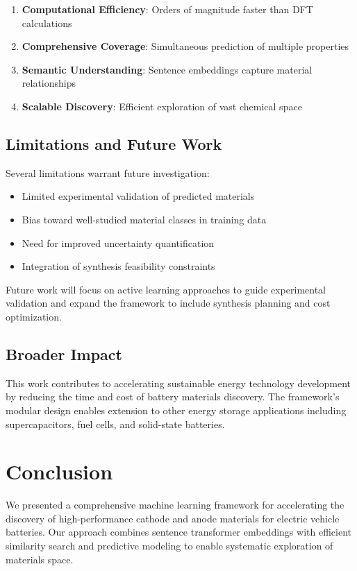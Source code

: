 \documentclass{article}
\begin{document}
\begin{enumerate}
\item \textbf{Computational Efficiency}: Orders of magnitude faster than DFT calculations
\item \textbf{Comprehensive Coverage}: Simultaneous prediction of multiple properties
\item \textbf{Semantic Understanding}: Sentence embeddings capture material relationships
\item \textbf{Scalable Discovery}: Efficient exploration of vast chemical space
\end{enumerate}

\subsection{Limitations and Future Work}

Several limitations warrant future investigation:
\begin{itemize}
\item Limited experimental validation of predicted materials
\item Bias toward well-studied material classes in training data
\item Need for improved uncertainty quantification
\item Integration of synthesis feasibility constraints
\end{itemize}

Future work will focus on active learning approaches to guide experimental validation and expand the framework to include synthesis planning and cost optimization.

\subsection{Broader Impact}

This work contributes to accelerating sustainable energy technology development by reducing the time and cost of battery materials discovery. The framework's modular design enables extension to other energy storage applications including supercapacitors, fuel cells, and solid-state batteries.

\section{Conclusion}

We presented a comprehensive machine learning framework for accelerating the discovery of high-performance cathode and anode materials for electric vehicle batteries. Our approach combines sentence transformer embeddings with efficient similarity search and predictive modeling to enable systematic exploration of materials space.
\end{document}
